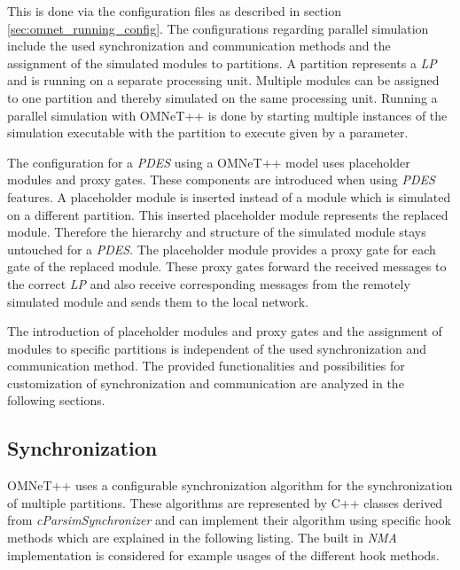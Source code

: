 This is done via the configuration files as described in section \ref{sec:omnet_running_config}.
The configurations regarding parallel simulation include the used synchronization and communication methods and the assignment of the simulated modules to partitions.
A partition represents a \emph{LP} and is running on a separate processing unit.
Multiple modules can be assigned to one partition and thereby simulated on the same processing unit. 
Running a parallel simulation with OMNeT++ is done by starting multiple instances of the simulation executable with the partition to execute given by a parameter.

The configuration for a \emph{PDES} using a OMNeT++ model uses placeholder modules and proxy gates.
These components are introduced when using \emph{PDES} features.
A placeholder module is inserted instead of a module which is simulated on a different partition.
This inserted placeholder module represents the replaced module.
Therefore the hierarchy and structure of the simulated module stays untouched for a \emph{PDES}.
The placeholder module provides a proxy gate for each gate of the replaced module.
These proxy gates forward the received messages to the correct \emph{LP} and also receive corresponding messages from the remotely simulated module and sends them to the local network.
\cite[section III]{varga_parallel_2003} \cite[chapter 16]{omnet_manual}

The introduction of placeholder modules and proxy gates and the assignment of modules to specific partitions is independent of the used synchronization and communication method.
The provided functionalities and possibilities for customization of synchronization and communication are analyzed in the following sections.

\subsection{Synchronization}
\label{sec:parallel_omnet_sync}
OMNeT++ uses a configurable synchronization algorithm for the synchronization of multiple partitions.
These algorithms are represented by C++ classes derived from \emph{cParsimSynchronizer} and can implement their algorithm using specific hook methods which are explained in the following listing.
The built in \emph{NMA} implementation is considered for example usages of the different hook methods.


